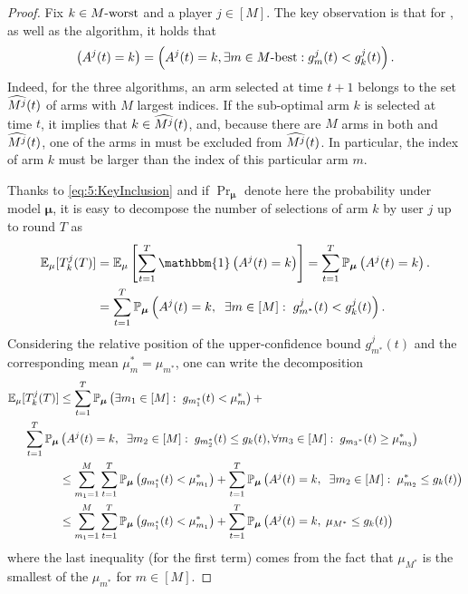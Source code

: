 \begin{proof}
  Fix $k\in M\text{-}\mathrm{worst}$ and a player $j \in [M]$.
  The key observation is that for \MCTopM, \RandTopM{} as well as the \rhoRand{} algorithm, it holds that
  \begin{equation}\left(A^j(t) = k\right) = \left(A^j(t) = k , \exists m \in M\text{-}\mathrm{best} : g_m^j(t) < g_k^j(t) \right).\label{eq:5:KeyInclusion}\end{equation}
  Indeed, for the three algorithms, an arm selected at time $t+1$ belongs to the set $\widehat{M^j}(t)$ of arms with $M$ largest indices.
  If the sub-optimal arm $k$ is selected at time $t$, it implies that $k \in \widehat{M^j}(t)$, and, because there are $M$ arms in both \Mbest{} and $\widehat{M^j}(t)$, one of the arms in \Mbest{} must be excluded from $\widehat{M^j}(t)$.
  In particular, the index of arm $k$ must be larger than the index of this particular arm $m$.

  Thanks to \eqref{eq:5:KeyInclusion} and if $\Pr_{\bm{\mu}} $ denote here the probability under model $\bm{\mu}$, it is easy to decompose the number of selections of arm $k$ by user $j$ up to round $T$ as
  \begin{align*}
  \E_{\mu}[T_k^j(T)]
  &= \E_{\mu}\left[ \sum_{t=1}^T \mathbbm{1}\left( A^j(t) = k \right) \right]
  = \sum_{t=1}^T \Pr_{\bm{\mu}} \left( A^j(t) = k \right).\\
  &= \sum_{t=1}^T \Pr_{\bm{\mu}} \left( A^j(t) = k,\;\; \exists m \in[M]:\; g_{m^*}^j(t) < g_k^j(t) \right).
  \end{align*}
  Considering the relative position of the upper-confidence bound $g_{m^*}^j(t)$ and the corresponding mean $\mu_m^* = \mu_{m^*}$, one can write the decomposition
  \begin{align}
    \mathbb{E}_{\mu}[T_k^j(T)] &\leq
    \sum_{t=1}^T\mathbb{P}_{\bm{\mu}} \left( \exists m_1 \in [M]: \; g_{m_1^*}(t) < \mu_m^* \right) + \notag \\
    \;\;\;\;
    \sum_{t=1}^T\mathbb{P}_{\bm{\mu}} & \left(A^j(t) = k,\;\; \exists m_2 \in [M]:\; g_{m_2^*}(t) \leq g_k(t) , \forall {m_3} \in [M]: \;  g_{{m_3}^*}(t) \geq \mu_{m_3}^* \right) \notag \\
    &\leq \sum_{m_1=1}^M\sum_{t=1}^T\mathbb{P}_{\bm{\mu}} \left(g_{m_1^*}(t) < \mu_{m_1}^* \right) + \sum_{t=1}^T\mathbb{P}_{\bm{\mu}} \left(A^j(t) = k,\;\; \exists m_2 \in [M]:\; \mu_{m_2}^* \leq g_k(t)\right) \notag \\
    & \leq \sum_{m_1=1}^M \sum_{t=1}^T \mathbb{P}_{\bm{\mu}} \left( g_{m_1^*}(t) < \mu_{m_1}^* \right)
    + \sum_{t=1}^T \mathbb{P}_{\bm{\mu}} \left( A^j(t) = k,\; \mu_{M^*} \leq g_k(t) \right)
    \label{eq:5:sumOfProbaForTkj}
  \end{align}
  where the last inequality (for the first term) comes from the fact that $\mu_{M^*}$ is the smallest of the $\mu_{m^*}$ for $m \in [M]$.


\end{proof}
